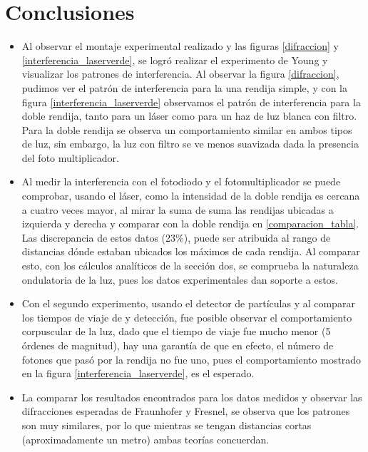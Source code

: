 \documentclass[%
 reprint,
 amsmath,amssymb,
 aps,
]{revtex4-1}
\begin{document}
{%

\section{Conclusiones}
\begin{itemize}
    \item Al observar el montaje experimental realizado y las figuras \ref{difraccion} y \ref{interferencia_laserverde}, se logró realizar el experimento de Young y visualizar los patrones de interferencia. Al observar la figura \ref{difraccion}, pudimos ver el patrón de interferencia para la una rendija simple, y con la figura \ref{interferencia_laserverde} observamos el patrón de interferencia para la doble rendija, tanto para un láser como para un haz de luz blanca con filtro. Para la doble rendija se observa un comportamiento similar en ambos tipos de luz, sin embargo, la luz con filtro se ve menos suavizada dada la presencia del foto multiplicador.
    \item Al medir la interferencia con el fotodiodo y el fotomultiplicador se puede comprobar, usando el láser, como la intensidad de la doble rendija es cercana a cuatro veces mayor, al mirar la suma de suma las rendijas ubicadas a izquierda y derecha y comparar con la doble rendija en \ref{comparacion_tabla}. Las discrepancia de estos datos (23{\%}), puede ser atribuida al rango de distancias dónde estaban ubicados los máximos de cada rendija. Al comparar esto, con los cálculos analíticos de la sección dos, se comprueba la naturaleza ondulatoria de la luz, pues los datos experimentales dan soporte a estos. 
    \item Con el segundo experimento, usando el detector de partículas y al comparar los tiempos de viaje de y detección, fue posible observar el comportamiento corpuscular de la luz, dado que el tiempo de viaje fue mucho menor (5 órdenes de magnitud), hay una garantía de que en efecto, el número de fotones que pasó por la rendija no fue uno, pues el comportamiento mostrado en la figura \ref{interferencia_laserverde}, es el esperado.
    \item La comparar los resultados encontrados para los datos medidos y observar las difracciones esperadas de Fraunhofer y Fresnel, se observa que los patrones son muy similares, por lo que mientras se tengan distancias cortas (aproximadamente un metro) ambas teorías concuerdan.
\end{itemize}

}
\end{document}
